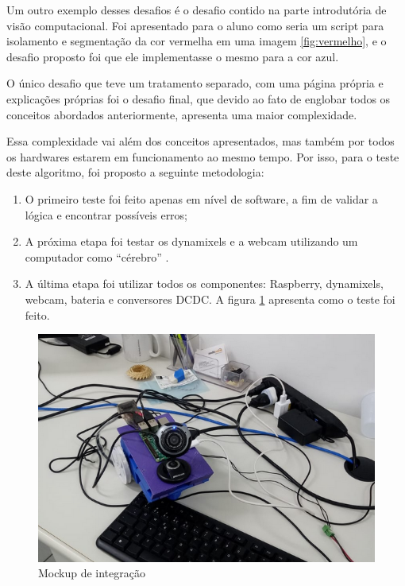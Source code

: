 Um outro exemplo desses desafios é o desafio contido na parte introdutória de visão computacional. Foi apresentado para o aluno como seria um script para isolamento e segmentação da cor vermelha em uma imagem \ref{fig:vermelho}, e o desafio proposto foi que ele implementasse o mesmo para a cor azul.

O único desafio que teve um tratamento separado, com uma página própria e explicações próprias foi o desafio final, que devido ao fato de englobar todos os conceitos abordados anteriormente, apresenta uma maior complexidade.

Essa complexidade vai além dos conceitos apresentados, mas também por todos os hardwares estarem em funcionamento ao mesmo tempo. Por isso, para o teste deste algoritmo, foi proposto a seguinte metodologia:

\begin{enumerate}
	\item O primeiro teste foi feito apenas em nível de software, a fim de validar a lógica e encontrar possíveis erros;
	\item A próxima etapa foi testar os dynamixels e a webcam utilizando um computador como “cérebro” .
	\item A última etapa foi utilizar todos os componentes: Raspberry, dynamixels, webcam, bateria e conversores DCDC. A figura \ref{fig:testefinal} apresenta como o teste foi feito.
\end{enumerate}

\begin{figure}[H]
	\centering
	\includegraphics[scale=0.75, angle=0]{Figures/testefinal.png}
	\caption{Mockup de integração}
	\label{fig:testefinal}
\end{figure}

